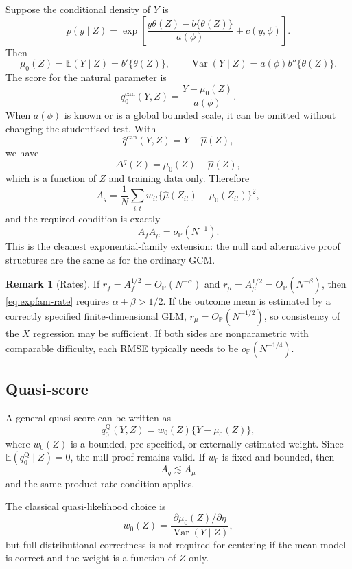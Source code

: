 \documentclass[11pt]{article}
\theoremstyle{definition}
\newtheorem{remark}[theorem]{Remark}
\newcommand{\E}{\mathbb{E}}
\newcommand{\Var}{\operatorname{Var}}
\newcommand{\op}{o_{\mathbb{P}}}
\newcommand{\Op}{O_{\mathbb{P}}}
\begin{document}
Suppose the conditional density of $Y$ is
\[
p(y\mid Z)
=
\exp\left[
\frac{y\theta(Z)-b\{\theta(Z)\}}{a(\phi)}+c(y,\phi)
\right].
\]
Then
\[
\mu_0(Z)=\E(Y\mid Z)=b'\{\theta(Z)\},
\qquad
\Var(Y\mid Z)=a(\phi)b''\{\theta(Z)\}.
\]
The score for the natural parameter is
\begin{equation}
q_0^{\mathrm{can}}(Y,Z)
=\frac{Y-\mu_0(Z)}{a(\phi)}.
\label{eq:canonical-score}
\end{equation}
When $a(\phi)$ is known or is a global bounded scale, it can be omitted without changing the
studentised test. With
\[
\widehat q^{\mathrm{can}}(Y,Z)=Y-\widehat\mu(Z),
\]
we have
\[
\Delta^q(Z)=\mu_0(Z)-\widehat\mu(Z),
\]
which is a function of $Z$ and training data only. Therefore
\[
A_q
=
\frac1N\sum_{i,t}w_{it}
\{\widehat\mu(Z_{it})-\mu_0(Z_{it})\}^2,
\]
and the required condition is exactly
\begin{equation}
A_fA_\mu=\op(N^{-1}).
\label{eq:expfam-rate}
\end{equation}
This is the cleanest exponential-family extension: the null and alternative proof structures
are the same as for the ordinary GCM.

\begin{remark}[Rates]
If $r_f=A_f^{1/2}=\Op(N^{-\alpha})$ and
$r_\mu=A_\mu^{1/2}=\Op(N^{-\beta})$, then
\eqref{eq:expfam-rate} requires $\alpha+\beta>1/2$.
If the outcome mean is estimated by a correctly specified finite-dimensional GLM,
$r_\mu=\Op(N^{-1/2})$, so consistency of the $X$ regression may be sufficient.
If both sides are nonparametric with comparable difficulty, each RMSE typically needs to be
$o_{\mathbb P}(N^{-1/4})$.
\end{remark}

\subsection{Quasi-score}

A general quasi-score can be written as
\begin{equation}
q_0^{\mathrm{Q}}(Y,Z)
=w_0(Z)\{Y-\mu_0(Z)\},
\label{eq:quasi-score}
\end{equation}
where $w_0(Z)$ is a bounded, pre-specified, or externally estimated weight. Since
$\E(q_0^{\mathrm{Q}}\mid Z)=0$, the null proof remains valid. If $w_0$ is fixed and bounded,
then
\[
A_q\lesssim A_\mu
\]
and the same product-rate condition applies.

The classical quasi-likelihood choice is
\[
w_0(Z)=\frac{\partial\mu_0(Z)/\partial\eta}
{\Var(Y\mid Z)},
\]
but full distributional correctness is not required for centering if the mean model is correct
and the weight is a function of $Z$ only.
\end{document}
